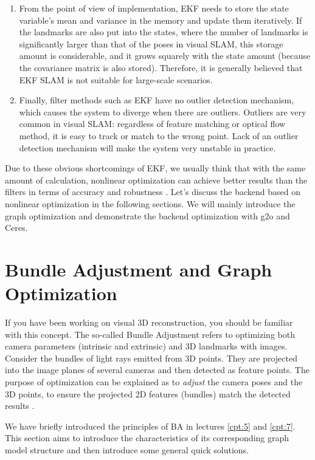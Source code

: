 \begin{enumerate}
	\item 
	From the point of view of implementation, EKF needs to store the state variable's mean and variance in the memory and update them iteratively. If the landmarks are also put into the states, where the number of landmarks is significantly larger than that of the poses in visual SLAM, this storage amount is considerable, and it grows squarely with the state amount (because the covariance matrix is also ​​stored). Therefore, it is generally believed that EKF SLAM is not suitable for large-scale scenarios.
	
	\item 
	Finally, filter methods such as EKF have no outlier detection mechanism, which causes the system to diverge when there are outliers. Outliers are very common in visual SLAM: regardless of feature matching or optical flow method, it is easy to track or match to the wrong point. Lack of an outlier detection mechanism will make the system very unstable in practice.
\end{enumerate}

Due to these obvious shortcomings of EKF, we usually think that with the same amount of calculation, nonlinear optimization can achieve better results than the filters in terms of accuracy and robustness  {\cite{Strasdat2012}}. Let's discuss the backend based on nonlinear optimization in the following sections. We will mainly introduce the graph optimization and demonstrate the backend optimization with g2o and Ceres.

\section{Bundle Adjustment and Graph Optimization}
If you have been working on visual 3D reconstruction, you should be familiar with this concept. The so-called Bundle Adjustment refers to optimizing both camera parameters (intrinsic and extrinsic) and 3D landmarks with images. Consider the bundles of light rays emitted from 3D points. They are projected into the image planes of several cameras and then detected as feature points. The purpose of optimization can be explained as to \textit{adjust} the camera poses and the 3D points, to ensure the projected 2D features (bundles) match the detected results {\cite{Triggs2000}}.

We have briefly introduced the principles of BA in lectures \ref{cpt:5} and \ref{cpt:7}. This section aims to introduce the characteristics of its corresponding graph model structure and then introduce some general quick solutions.

